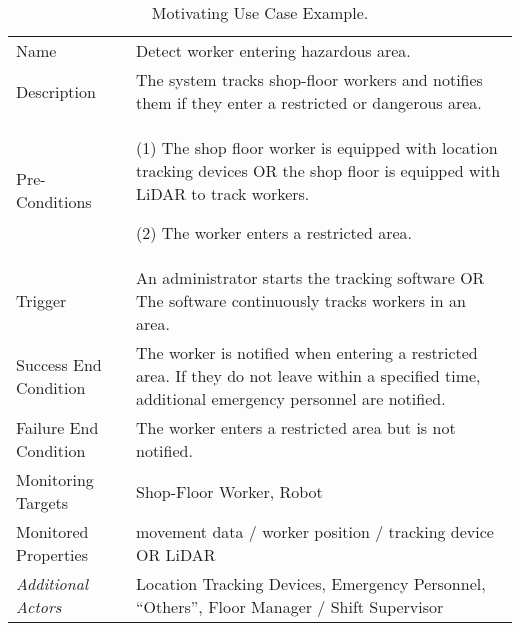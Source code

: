 \begin{table}[hbt]
\footnotesize
\caption{Motivating Use Case Example.}
\renewcommand*{\arraystretch}{1.22}
\label{tab:motivating-example}
\begin{tabularx}{\columnwidth}{L{2.75cm}X}

\toprule
Name & Detect worker entering hazardous area. \\
Description & The system tracks shop-floor workers and notifies them if they enter a restricted or dangerous area. \\
Pre-Conditions & (1) The shop floor worker is equipped with location tracking devices OR the shop floor is equipped with LiDAR to track workers. 

(2) The worker enters a restricted area. \\
Trigger & An administrator starts the tracking software OR The software continuously tracks workers in an area. \\
Success End Condition & The worker is notified when entering a restricted area. If they do not leave within a specified  time, additional emergency personnel are notified. \\

Failure End Condition & The worker enters a restricted area but is not notified.\\
\midrule
Monitoring Targets & Shop-Floor Worker, Robot \\
Monitored Properties & movement data / worker position / tracking device OR LiDAR\\

\emph{Additional Actors} & Location Tracking Devices, Emergency Personnel, \enquote{Others}, Floor Manager / Shift Supervisor\\

\bottomrule
\end{tabularx}
\renewcommand*{\arraystretch}{1}
\end{table}
